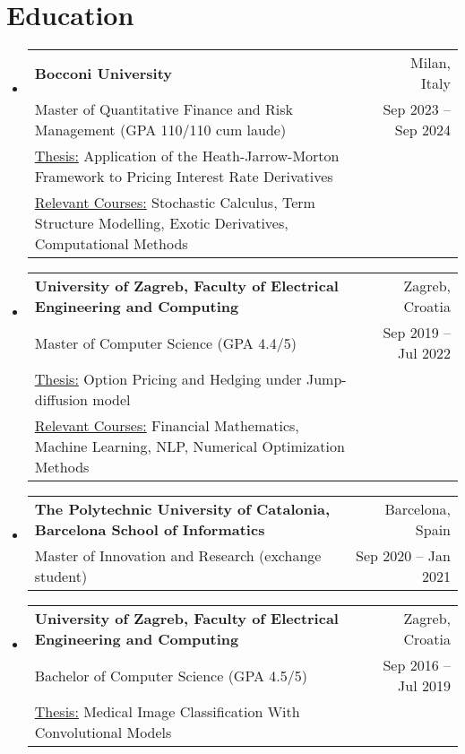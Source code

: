 \documentclass[letterpaper,10pt]{article}
\makeatletter
\newcommand{\resumeItem}[1]{
  \item\small{
    {#1 \vspace{-2pt}}
  }
}
\newcommand{\resumeSubheading}[4]{
  \vspace{-2pt}\item
    \begin{tabular*}{0.97\textwidth}[t]{l@{\extracolsep{\fill}}r}
      \textbf{#1} & #2 \\
      \small #3 & \small #4 \\
    \end{tabular*}\vspace{-7pt}
}
\newcommand{\resumeSubheadingWithAdditional}[6]{
  \vspace{-2pt}\item
    \begin{tabular*}{0.97\textwidth}[t]{l@{\extracolsep{\fill}}r}
      \textbf{#1} & #2 \\
      \small #3 & \small #4 \\
      \small #5 \\
      \small #6
    \end{tabular*}\vspace{-7pt}
}
\newcommand{\resumeSubheadingWithAdditionall}[5]{
  \vspace{-2pt}\item
    \begin{tabular*}{0.97\textwidth}[t]{l@{\extracolsep{\fill}}r}
      \textbf{#1} & #2 \\
      \small #3 & \small #4 \\
      \small #5
    \end{tabular*}\vspace{-7pt}
}
\newcommand{\resumeProjectHeading}[2]{
    \item
    \begin{tabular*}{0.97\textwidth}{l@{\extracolsep{\fill}}r}
      \small#1 & #2 \\
    \end{tabular*}\vspace{-7pt}
}
\newcommand{\resumeSubHeadingListStart}{\begin{itemize}[leftmargin=0.15in, label={}]}
\newcommand{\resumeSubHeadingListEnd}{\end{itemize}}
\newcommand{\resumeItemListStart}{\begin{itemize}}
\newcommand{\resumeItemListEnd}{\end{itemize}\vspace{-5pt}}
\makeatother
\begin{document}

\vspace{-10pt}
\section{Education}
  \resumeSubHeadingListStart
    \resumeSubheadingWithAdditional
      {Bocconi University}{Milan, Italy}
      {Master of Quantitative Finance and Risk Management (GPA 110/110 cum laude)}{Sep 2023 -- Sep 2024}{\underline{Thesis:} Application of the Heath-Jarrow-Morton Framework to Pricing Interest Rate Derivatives}{\underline{Relevant Courses:} Stochastic Calculus, Term Structure Modelling, Exotic Derivatives, Computational Methods}
    \resumeSubheadingWithAdditional
      {University of Zagreb, Faculty of Electrical Engineering and Computing}{Zagreb, Croatia}
      {Master of Computer Science (GPA 4.4/5)}{Sep 2019 -- Jul 2022}{\underline{Thesis:} Option Pricing and Hedging under Jump-diffusion model}
      {\underline{Relevant Courses:} Financial Mathematics, Machine Learning, NLP, Numerical Optimization Methods}
    \resumeSubheading 
      {The Polytechnic University of Catalonia, Barcelona School of Informatics}{Barcelona, Spain}
      {Master of Innovation and Research (exchange student)}{Sep 2020 -- Jan 2021}
    \resumeSubheadingWithAdditionall
      {University of Zagreb, Faculty of Electrical Engineering and Computing}{Zagreb, Croatia}
      {Bachelor of Computer Science (GPA 4.5/5)}{Sep 2016 -- Jul 2019}{\underline{Thesis:} Medical Image Classification With Convolutional Models}
  \resumeSubHeadingListEnd
\end{document}

